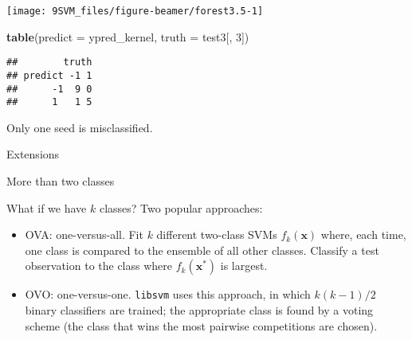 \documentclass[10pt,ignorenonframetext,]{beamer}
\newenvironment{Shaded}{\begin{snugshade}}{\end{snugshade}}
\newcommand{\KeywordTok}[1]{\textcolor[rgb]{0.13,0.29,0.53}{\textbf{#1}}}
\newcommand{\DataTypeTok}[1]{\textcolor[rgb]{0.13,0.29,0.53}{#1}}
\newcommand{\DecValTok}[1]{\textcolor[rgb]{0.00,0.00,0.81}{#1}}
\newcommand{\NormalTok}[1]{#1}
\begin{document}
\begin{frame}

\scriptsize

\begin{center}\texttt{[image: 9SVM\_files/figure-beamer/forest3.5-1]} \end{center}

\end{frame}

\begin{frame}[fragile]

\scriptsize

\begin{Shaded}
\begin{Highlighting}[]
\KeywordTok{table}\NormalTok{(}\DataTypeTok{predict =}\NormalTok{ ypred_kernel, }\DataTypeTok{truth =}\NormalTok{ test3[, }\DecValTok{3}\NormalTok{])}
\end{Highlighting}
\end{Shaded}

\begin{verbatim}
##        truth
## predict -1 1
##      -1  9 0
##      1   1 5
\end{verbatim}

\normalsize  Only one seed is misclassified.

\end{frame}

\begin{frame}[fragile]{Extensions}

\begin{block}{More than two classes}

\vspace{2mm}

What if we have \(k\) classes? Two popular approaches:

\begin{itemize}
\item
  OVA: one-versus-all. Fit \(k\) different two-class SVMs
  \(f_k({\boldsymbol x})\) where, each time, one class is compared to
  the ensemble of all other classes. Classify a test observation to the
  class where \(f_k({\boldsymbol x}^*)\) is largest.
\item
  OVO: one-versus-one. \texttt{libsvm} uses this approach, in which
  \(k(k-1)/2\) binary classifiers are trained; the appropriate class is
  found by a voting scheme (the class that wins the most pairwise
  competitions are chosen).
\end{itemize}

\end{block}

\end{frame}
\end{document}
